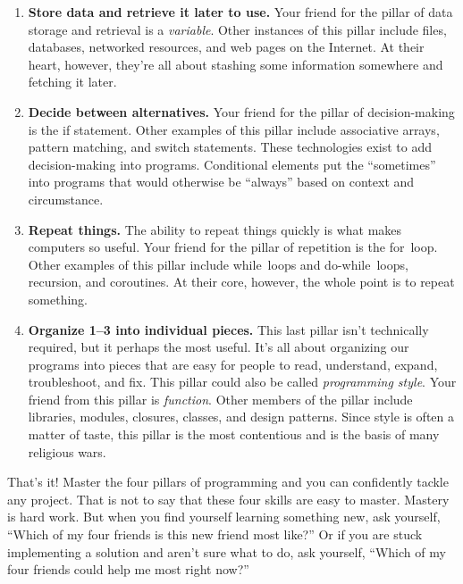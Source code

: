 \begin{enumerate}
  \item \textbf{Store data and retrieve it later to use.}
Your friend for the pillar of data storage and retrieval is a \emph{variable}.
Other instances of this pillar include files, databases, networked resources,
and web pages on the Internet. At their heart, however, they're all about
stashing some information somewhere and fetching it later.

  \item \textbf{Decide between alternatives.}
Your friend for the pillar of decision-making is the \textsf{if} statement.
Other examples of this pillar include associative arrays, pattern matching, and
\textsf{switch} statements. These technologies exist to add decision-making into
programs. Conditional elements put the ``sometimes'' into programs that would
otherwise be ``always'' based on context and circumstance.

  \item \textbf{Repeat things.}
The ability to repeat things quickly is what makes computers so useful. Your
friend for the pillar of repetition is the \textsf{for}~loop. Other examples of
this pillar include \textsf{while}~loops and \textsf{do-while}~loops, recursion,
and coroutines. At their core, however, the whole point is to repeat something.

  \item \textbf{Organize 1--3 into individual pieces.}
This last pillar isn't technically required, but it perhaps the most
useful. It's all about organizing our
programs into pieces that are easy for people to read, understand, expand,
troubleshoot, and fix. This pillar could also be called \emph{programming
style}. Your friend from this pillar is \emph{function}. Other members of the
pillar include libraries, modules, closures, classes, and design
patterns. Since style is often a matter
of taste, this pillar is the most contentious and is the basis of many religious
wars.
\end{enumerate}

That's it! Master the four pillars of programming and you can confidently tackle
any project. That is not to say that these four skills are easy to master.
Mastery is hard work. But when you find yourself learning something new, ask
yourself, ``Which of my four friends is this new friend most like?'' Or if you
are stuck implementing a solution and aren't sure what to do, ask yourself,
``Which of my four friends could help me most right now?''

